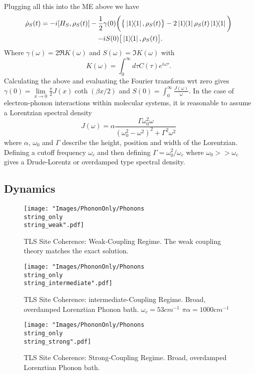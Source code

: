 \documentclass[]{article}
\begin{document}
Plugging all this into the ME above we have
\begin{align}
\dot{\rho}_S(t) = -i[H_S, \rho_S(t)] -\frac{1}{2}&\gamma(0)\bigg(\big\{\dyad{1},\rho_S(t)\big\} - 2\dyad{1}\rho_S(t)\dyad{1}\bigg)\\-&iS(0)\big[\dyad{1},\rho_S(t)\big].
\end{align}
Where $\gamma(\omega)=2\Re{K(\omega)}$ and $S(\omega)=\Im{K(\omega)}$ with
\begin{equation}
K(\omega) = \int_{0}^{\infty}d\tau C(\tau)e^{i\omega\tau}.
\end{equation}
Calculating the above and evaluating the Fourier transform wrt zero gives $\gamma(0)=\lim\limits_{x\to0}\frac{\pi}{2}J(x)\coth(\beta x/2)$ and $S(0)=\int_{0}^{\infty}\frac{J(\omega)}{\omega}$.
In the case of electron-phonon interactions within molecular systems, it is reasonable to assume a Lorentzian spectral density
\begin{equation}
J(\omega) = \alpha \frac{\Gamma \omega_0^2 \omega}{(\omega_0^2 - \omega^2)^2 + \Gamma^2\omega^2}
\end{equation}
where $\alpha$, $\omega_0$ and $\Gamma$ describe the height, position and width of the Lorentzian. Defining a cutoff frequency $\omega_c$ and then defining $\Gamma = \omega_0^2/\omega_c$ where $\omega_0>>\omega_c$ gives a Drude-Lorentz or overdamped type spectral density.

\subsection{Dynamics}
\begin{figure}[t]
	\centering
	\begin{minipage}[b]{0.325\textwidth}
		\texttt{[image: "Images/PhononOnly/Phonons\\string\_only\\string\_weak".pdf]}
		\caption{TLS Site Coherence: Weak-Coupling Regime. The weak coupling theory matches the exact solution.}
		\label{fig:PhononOnlyWeak}
	\end{minipage}
	\begin{minipage}[b]{0.325\textwidth}
		\texttt{[image: "Images/PhononOnly/Phonons\\string\_only\\string\_intermediate".pdf]}
		\caption{TLS Site Coherence: intermediate-Coupling Regime. Broad, overdamped Lorenztian Phonon bath. $\omega_{c}=53cm^{-1}$ $\pi\alpha=1000cm^{-1}$}
		\label{fig:PhononOnlyIntermediate}
	\end{minipage}
	\begin{minipage}[b]{0.325\textwidth}
		\texttt{[image: "Images/PhononOnly/Phonons\\string\_only\\string\_strong".pdf]}
		\caption{TLS Site Coherence: Strong-Coupling Regime. Broad, overdamped Lorenztian Phonon bath.}
		\label{fig:PhononOnlyStrong}
	\end{minipage}
\end{figure}
\end{document}
